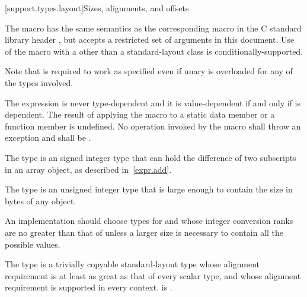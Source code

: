 
[support.types.layout]{Sizes, alignments, and offsets}

\pnum
The macro
%
has the same semantics as the corresponding macro in
the C standard library header , but
accepts a restricted set of 
arguments in this document.
Use of the  macro with a 
other than a standard-layout class
is conditionally-supported.
\begin{footnote}
Note that 
is required to work as specified even if unary
is overloaded for any of the types involved.
\end{footnote}
The expression 
is never type-dependent and it is
value-dependent if and only if  is
dependent. The result of applying the  macro to
a static data member or a function member is undefined.
No operation invoked by the  macro shall throw an exception and
 shall be .

\pnum
The type  is an
signed integer type that can
hold the difference of two subscripts in an array object, as described in~\ref{expr.add}.

\pnum
The type  is an
unsigned integer type that is large enough
to contain the size in bytes of any object.

\pnum
\recommended
An implementation should choose types for  and 
whose integer conversion ranks are no greater than that of
 unless a larger size is necessary to contain all the possible values.

\pnum
The type
%
 is a trivially copyable standard-layout type whose alignment requirement
is at least as great as that of every scalar type, and whose alignment
requirement is supported in every context.
 is .


